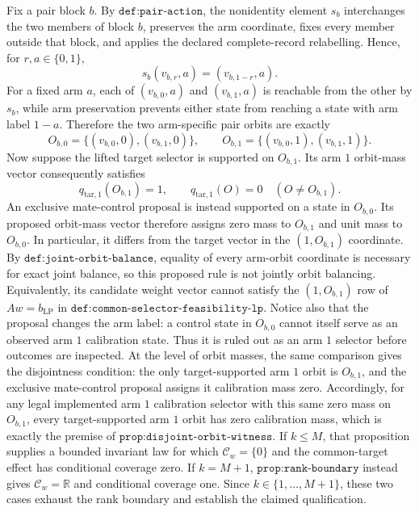 Fix a pair block \(b\). By \(\texttt{def:pair-action}\), the nonidentity element \(s_b\) interchanges the two members of block \(b\), preserves the arm coordinate, fixes every member outside that block, and applies the declared complete-record relabelling. Hence, for \(r,a\in\{0,1\}\),\[s_b(v_{b,r},a)=(v_{b,1-r},a).\]For a fixed arm \(a\), each of \( (v_{b,0},a)\) and \( (v_{b,1},a)\) is reachable from the other by \(s_b\), while arm preservation prevents either state from reaching a state with arm label \(1-a\). Therefore the two arm-specific pair orbits are exactly\[O_{b,0}=\{(v_{b,0},0),(v_{b,1},0)\},\qquad O_{b,1}=\{(v_{b,0},1),(v_{b,1},1)\}.\]
Now suppose the lifted target selector is supported on \(O_{b,1}\). Its arm \(1\) orbit-mass vector consequently satisfies\[q_{\mathrm{tar},1}(O_{b,1})=1,\qquad q_{\mathrm{tar},1}(O)=0\quad(O\ne O_{b,1}).\]An exclusive mate-control proposal is instead supported on a state in \(O_{b,0}\). Its proposed orbit-mass vector therefore assigns zero mass to \(O_{b,1}\) and unit mass to \(O_{b,0}\). In particular, it differs from the target vector in the \((1,O_{b,1})\) coordinate. By \(\texttt{def:joint-orbit-balance}\), equality of every arm-orbit coordinate is necessary for exact joint balance, so this proposed rule is not jointly orbit balancing. Equivalently, its candidate weight vector cannot satisfy the \((1,O_{b,1})\) row of \(Aw=b_{\mathrm{LP}}\) in \(\texttt{def:common-selector-feasibility-lp}\). Notice also that the proposal changes the arm label: a control state in \(O_{b,0}\) cannot itself serve as an observed arm \(1\) calibration state. Thus it is ruled out as an arm \(1\) selector before outcomes are inspected.
At the level of orbit masses, the same comparison gives the disjointness condition: the only target-supported arm \(1\) orbit is \(O_{b,1}\), and the exclusive mate-control proposal assigns it calibration mass zero. Accordingly, for any legal implemented arm \(1\) calibration selector with this same zero mass on \(O_{b,1}\), every target-supported arm \(1\) orbit has zero calibration mass, which is exactly the premise of \(\texttt{prop:disjoint-orbit-witness}\). If \(k\le M\), that proposition supplies a bounded invariant law for which \(\mathcal C_w=\{0\}\) and the common-target effect has conditional coverage zero. If \(k=M+1\), \(\texttt{prop:rank-boundary}\) instead gives \(\mathcal C_w=\mathbb R\) and conditional coverage one. Since \(k\in\{1,\ldots,M+1\}\), these two cases exhaust the rank boundary and establish the claimed qualification.